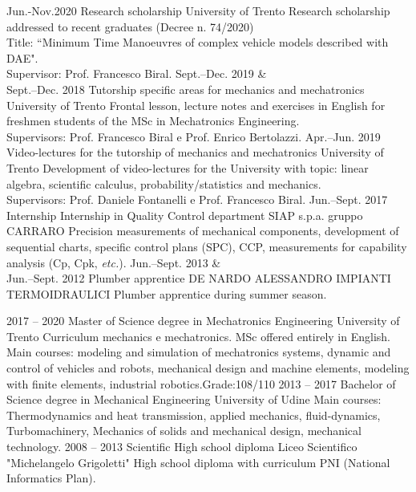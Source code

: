 \documentclass[9pt]{developercv} %
\begin{document}
%
\begin{entrylist}
	\entry
		{Jun.-Nov.2020}
		{Research scholarship}
		{University of Trento}
		{Research scholarship addressed to recent graduates (Decree n. 74/2020)\\ 
		Title: “Minimum Time Manoeuvres of complex vehicle models described with DAE".\\ 
		Supervisor: Prof. Francesco Biral.}
	\entry
		{Sept.--Dec. 2019 \&\\Sept.--Dec. 2018}
		{Tutorship specific areas for mechanics and mechatronics}
		{University of Trento}
		{Frontal lesson, lecture notes and exercises in English for freshmen students of the MSc in Mechatronics Engineering.\\
		Supervisors: Prof. Francesco Biral e Prof. Enrico Bertolazzi.}
	\entry
		{Apr.--Jun. 2019}
		{Video-lectures for the tutorship of mechanics and mechatronics}
		{University of Trento}
		{Development of video-lectures for the University with topic: linear algebra, scientific calculus, probability/statistics and mechanics.\\
		Supervisors: Prof. Daniele Fontanelli e Prof. Francesco Biral.}
	\entry
		{Jun.--Sept. 2017\\\footnotesize{Internship}}
		{Internship in Quality Control department}
		{SIAP s.p.a. gruppo CARRARO}
		{Precision measurements of mechanical components, development of sequential charts, specific control plans (SPC), CCP, measurements for capability analysis (Cp, Cpk, \textit{etc.}).
		}
	\entry
		{Jun.--Sept. 2013 \&\\Jun.--Sept. 2012}
		{Plumber apprentice}
		{DE NARDO ALESSANDRO IMPIANTI TERMOIDRAULICI}
		{Plumber apprentice during summer season.}
\end{entrylist}
%
%
%
\begin{entrylist}
	\entry
		{2017 -- 2020}
		{Master of Science degree in Mechatronics Engineering}
		{University of Trento}
		{Curriculum mechanics e mechatronics. MSc offered entirely in English.\\
		Main courses: modeling and simulation of mechatronics systems, dynamic and control of vehicles and robots, mechanical design and machine elements, modeling with finite elements, industrial robotics.\hfill Grade:108/110}
	\entry
		{2013 -- 2017}
		{Bachelor of Science degree in Mechanical Engineering}
		{University of Udine}
		{Main courses: Thermodynamics and heat transmission, applied mechanics, fluid-dynamics, Turbomachinery, Mechanics of solids and mechanical design, mechanical technology.} %
	\entry
		{2008 -- 2013}
		{Scientific High school diploma}
		{Liceo Scientifico "Michelangelo Grigoletti"}
		{High school diploma with curriculum PNI (National Informatics Plan). } %
\end{entrylist}
\end{document}
